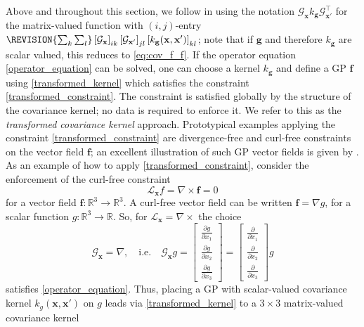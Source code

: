 Above and throughout this section, we follow  in using the notation $\mathcal{G}_{\mathbf{x}} k_{\mathbf{g}} \mathcal{G}_{\mathbf{x'}}^\top$ for the matrix-valued function with $(i,j)$-entry $\REVISION{\sum_{k} \sum_{l}}\left[ \mathcal{G}_{\mathbf{x}} \right]_{ik}
\left[ \mathcal{G}_{\mathbf{x'}} \right]_{jl} \left[ k_{\mathbf{g}}(\mathbf{x}, \mathbf{x}') \right]_{kl}$; 
note that if $\mathbf{g}$ and therefore $k_{\mathbf{g}}$ are scalar valued, this reduces to \eqref{eq:cov_f_f}.   
If the operator equation \eqref{operator_equation} can be solved, one can choose a kernel $k_{\mathbf{g}}$ and define a GP $\mathbf{f}$ using \eqref{transformed_kernel} which satisfies the constraint \eqref{transformed_constraint}. The constraint is satisfied globally by the structure of the covariance kernel; no data is required to enforce it. We refer to this as the \emph{transformed covariance kernel} approach. 
Prototypical examples applying the constraint \eqref{transformed_constraint} are divergence-free and curl-free constraints on the vector field $\mathbf{f}$; an excellent illustration of such GP vector fields is given by .
As an example of how to apply \eqref{transformed_constraint}, consider the enforcement of the curl-free constraint 
\begin{equation}
\mathcal{L}_{\mathbf{x}} f = 
\nabla \times \mathbf{f} = 0
\end{equation}
for a vector field $\mathbf{f}: \mathbb{R}^3 \rightarrow \mathbb{R}^3$. A curl-free vector field can be written
$\mathbf{f} = \nabla g$,
for a scalar function $g : \mathbb{R}^3 \rightarrow \mathbb{R}$. So, for $\mathcal{L}_{\mathbf{x}} = \nabla \times$ the choice 
\begin{equation}
\mathcal{G}_{\mathbf{x}}  = \nabla, \quad \text{i.e.} \quad
\mathcal{G}_{\mathbf{x}} g = 
\begin{bmatrix}
\frac{\partial g}{\partial x_1} \\[6pt]
\frac{\partial g}{\partial x_2} \\[6pt]
\frac{\partial g}{\partial x_3}
\end{bmatrix}
=
\begin{bmatrix}
\frac{\partial}{\partial x_1} \\[6pt]
\frac{\partial}{\partial x_2} \\[6pt]
\frac{\partial}{\partial x_3}
\end{bmatrix}
g
\end{equation}
satisfies \eqref{operator_equation}. 
Thus, placing a GP with scalar-valued covariance kernel $k_g(\mathbf{x},\mathbf{x}')$ on $g$ leads via \eqref{transformed_kernel} to a $3 \times 3$ matrix-valued covariance kernel 
